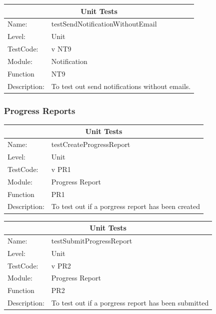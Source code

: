 \documentclass[12pt]{article}
\begin{document}
\begin{center}
\begin{tabular}{|l|p{12cm}|}
\hline
\multicolumn{2}{|c|}{\bf Unit Tests} \\
\hline
 Name: & testSendNotificationWithoutEmail \\
\hline
Level: & Unit \\
\hline
TestCode: & v NT9 \\
\hline
Module:& Notification\\
\hline
Function & NT9 \\
\hline
Description: & To test out send notifications without emails. \\
\hline

\end{tabular}
\end{center}
\subsubsection{Progress Reports}
\begin{center}
\begin{tabular}{|l|p{12cm}|}
\hline
\multicolumn{2}{|c|}{\bf Unit Tests} \\
\hline
 Name: & testCreateProgressReport \\
\hline
Level: & Unit \\
\hline
TestCode: & v PR1 \\
\hline
Module:& Progress Report\\
\hline
Function & PR1 \\
\hline
Description: & To test out if a porgress report has been created \\
\hline

\end{tabular}
\end{center}

\begin{center}
\begin{tabular}{|l|p{12cm}|}
\hline
\multicolumn{2}{|c|}{\bf Unit Tests} \\
\hline
 Name: & testSubmitProgressReport \\
\hline
Level: & Unit \\
\hline
TestCode: & v PR2 \\
\hline
Module:& Progress Report\\
\hline
Function & PR2 \\
\hline
Description: & To test out if a porgress report has been submitted \\
\hline

\end{tabular}
\end{center}
\end{document}
